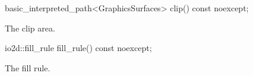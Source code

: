 %
\begin{itemdecl}
basic_interpreted_path<GraphicsSurfaces> clip() const noexcept;
\end{itemdecl}
\begin{itemdescr}
\pnum
\returns
The clip area.
\end{itemdescr}

%
\begin{itemdecl}
io2d::fill_rule fill_rule() const noexcept;
\end{itemdecl}
\begin{itemdescr}
\pnum
\returns
The fill rule.
\end{itemdescr}
